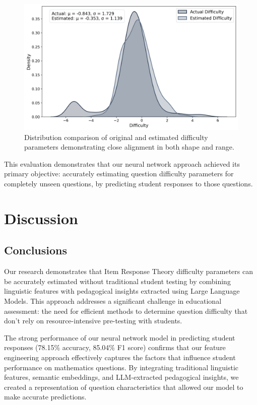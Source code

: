 \documentclass[
    a4paper, %
    10pt, %
    twoside, %
]{LTJournalArticle}
\begin{document}
\begin{figure}[H]
    \centering
    \includegraphics[width=1\columnwidth]{../one_model_experiment/figures/difficulty_distributions.png}
    \caption{Distribution comparison of original and estimated difficulty parameters demonstrating close alignment in both shape and range.}
    \label{fig:difficulty-distribution}
\end{figure}

This evaluation demonstrates that our neural network approach achieved its primary objective: accurately estimating question difficulty parameters for completely unseen questions, by predicting student responses to those questions.

\section{Discussion}

\subsection{Conclusions}

Our research demonstrates that Item Response Theory difficulty parameters can be accurately estimated without traditional student testing by combining linguistic features with pedagogical insights extracted using Large Language Models. This approach addresses a significant challenge in educational assessment: the need for efficient methods to determine question difficulty that don't rely on resource-intensive pre-testing with students.

The strong performance of our neural network model in predicting student responses (78.15\% accuracy, 85.04\% F1 score) confirms that our feature engineering approach effectively captures the factors that influence student performance on mathematics questions. By integrating traditional linguistic features, semantic embeddings, and LLM-extracted pedagogical insights, we created a representation of question characteristics that allowed our model to make accurate predictions.
\end{document}
